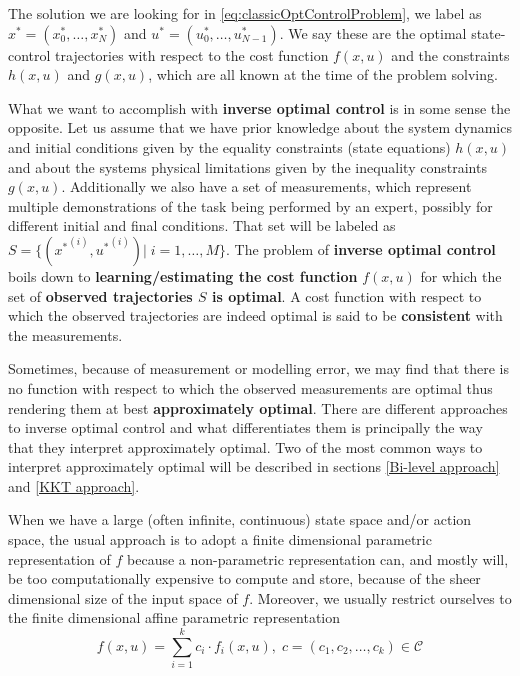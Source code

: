 \documentclass[12pt, a4paper]{article}
\begin{document}
The solution we are looking for in \eqref{eq:classicOptControlProblem}, we label as  \( x^* = (x^*_0, \ldots, x^*_N ) \) and \( u^* = (u^*_0,\ldots,u^*_{N-1})\). We say these are the optimal state-control trajectories with respect to the cost function \( f(x, u) \) and the constraints \( h(x, u) \) and \( g(x, u) \), which are all known at the time of the problem solving. \par
What we want to accomplish with \textbf{inverse optimal control} is in some sense the opposite. Let us assume that we have prior knowledge about the system dynamics and initial conditions given by the equality constraints (state equations) \( h(x,u) \) and about the systems physical limitations given by the inequality constraints \( g(x, u) \). Additionally we also have a set of measurements, which represent multiple demonstrations of the task being performed by an expert, possibly for different initial and final conditions. That set will be labeled as \( S = \{ ({x^*}^{(i)}, {u^*}^{(i)}) | \; i = 1, \ldots, M \} \). The problem of \textbf{inverse optimal control} boils down to \textbf{learning/estimating the cost function} \( f(x, u) \) for which the set of \textbf{observed trajectories \( S \) is optimal}. A cost function with respect to which the observed trajectories are indeed optimal is said to be \textbf{consistent} with the measurements.\par
Sometimes, because of measurement or modelling error, we may find that there is no function with respect to which the observed measurements are optimal thus rendering them at best \textbf{approximately optimal}. There are different approaches to inverse optimal control and what differentiates them is principally the way that they interpret approximately optimal. Two of the most common ways to interpret approximately optimal will be described in sections \ref{Bi-level approach} and \ref{KKT approach}.\par
When we have a large (often infinite, continuous) state space and/or action space, the usual approach is to adopt a finite dimensional parametric representation of \( f \) because a non-parametric representation can, and mostly will, be too computationally expensive to compute and store, because of the sheer dimensional size of the input space of \( f \). Moreover, we usually restrict ourselves to the finite dimensional affine parametric representation 
\begin{equation} \label{eq:AffineParametricRepresentation}
    f(x, u) = \sum_{i=1}^k c_i \cdot f_i(x, u), \; c = (c_1, c_2, \ldots, c_k)\in \mathcal{C}
\end{equation}
\end{document}
